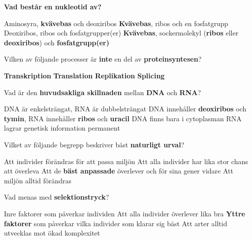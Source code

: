 \documentclass{exam}
\begin{document}
\begin{questions}

\question \textbf{Vad består en nukleotid av?}
\begin{checkboxes}
   \choice Aminosyra, \textbf{kv\"avebas} och deoxiribos
   \choice \textbf{Kvävebas}, ribos och en fosfatgrupp
   \choice Deoxiribos, ribos och fosfatgrupper(er)
   \correctchoice \textbf{Kvävebas}, sockermolekyl (\textbf{ribos} eller \textbf{deoxiribos}) och \textbf{fosfatgrupp(er)}
\end{checkboxes}
\vspace{5mm}
\hline

\question Vilken av följande processer är \textbf{inte} en del av \textbf{proteinsyntesen}?
\begin{checkboxes}
    \choice \textbf{Transkription}
    \choice \textbf{Translation}
    \correctchoice \textbf{Replikation}
    \choice \textbf{Splicing}
\end{checkboxes}
\vspace{5mm}
\hline

\question Vad är den \textbf{huvudsakliga skillnaden} mellan \textbf{DNA} och \textbf{RNA}?
\begin{checkboxes}
    \choice DNA är enkelsträngat, RNA är dubbelsträngat
    \correctchoice DNA innehåller \textbf{deoxiribos} och \textbf{tymin}, RNA innehåller \textbf{ribos} och \textbf{uracil}
    \choice DNA finns bara i cytoplasman
    \choice RNA lagrar genetisk information permanent
\end{checkboxes}
\vspace{5mm}
\hline

\question Vilket av följande begrepp beskriver bäst \textbf{naturligt urval}?
\begin{checkboxes}
    \choice Att individer förändras för att passa miljön
    \choice Att alla individer har lika stor chans att överleva
    \correctchoice Att de \textbf{bäst anpassade} överlever och för sina gener vidare
    \choice Att miljön alltid förändras
\end{checkboxes}
\vspace{5mm}
\hline

\question Vad menas med \textbf{selektionstryck}?
\begin{checkboxes}
    \choice Inre faktorer som påverkar individen
    \choice Att alla individer överlever lika bra
    \correctchoice \textbf{Yttre faktorer} som påverkar vilka individer som klarar sig bäst
    \choice Att arter alltid utvecklas mot ökad komplexitet
\end{checkboxes}
\vspace{5mm}
\hline


\end{questions}
\end{document}
